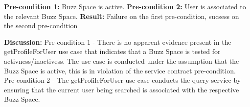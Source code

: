 \textbf{Pre-condition 1:}  Buzz Space is active. \newline
\textbf{Pre-condition 2:}  User is associated to the relevant Buzz Space.\newline
\textbf{Result:}  Failure on the first pre-condition, sucsess on the second pre-condition \newline\newline

\textbf{Discussion:} Pre-condition 1 - There is no apparent evidence present in the getProfileForUser use case that indicates that a Buzz Space is tested for activness/inactivess.
The use case is conducted under the assumption that the Buzz Space is active, this is in violation of the service contract pre-condition. Pre-condition 2 -   The getProfileForUser use case conducts the query service by ensuring that the current user being searched is associated with the respective Buzz Space.\newline \newline



